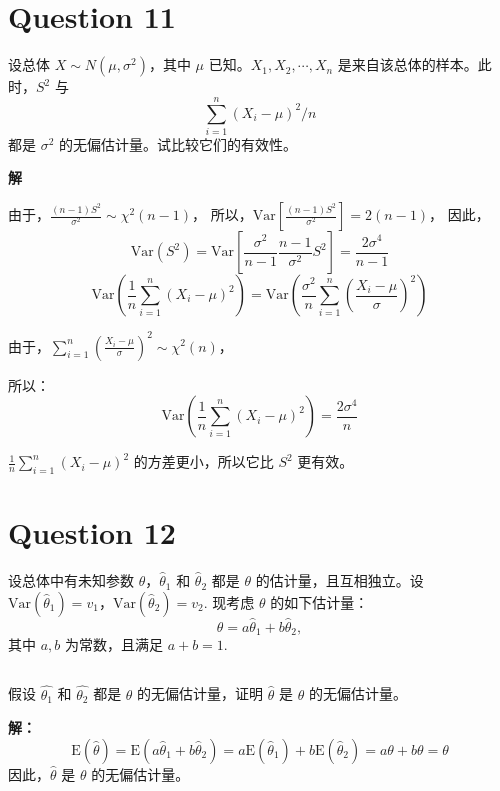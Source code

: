 \documentclass[12pt,a4paper]{article}
\begin{document}
\section{Question 11}

设总体 $X\sim N(\mu,\sigma^2)$，其中 $\mu$ 已知。$X_1,X_2,\cdots,X_n$ 是来自该总体的样本。此时，$S^2$ 与
\[
    \sum_{i=1}^{n}(X_i-\mu)^2/n
\]
都是 $\sigma^2$ 的无偏估计量。试比较它们的有效性。

\begin{answerbox}
\textbf{解}  

  由于，$\frac{(n-1)S^2}{\sigma^2} \sim \chi^2(n-1)$，
  所以，$\textrm{Var}\left[\frac{(n-1)S^2}{\sigma^2}\right] = 2(n-1)$，
  因此，
  $$
  \mathrm{Var}(S^2) = \mathrm{Var}\left[\frac{\sigma^2}{n-1} \frac{n-1}{\sigma^2} S^2\right] = \frac{2\sigma^4}{n-1}
  $$
  $$
  \mathrm{Var}\left(\frac{1}{n}\sum_{i=1}^n (X_i-\mu)^2\right) = \mathrm{Var}\left(\frac{\sigma^2}{n}\sum_{i=1}^n \left(\frac{X_i-\mu}{\sigma}\right)^2\right)
  $$
  
  由于，$\sum_{i=1}^n \left(\frac{X_i-\mu}{\sigma}\right)^2 \sim \chi^2(n)$，

  所以：
  $$
  \mathrm{Var}\left(\frac{1}{n}\sum_{i=1}^n (X_i-\mu)^2\right) = \frac{2\sigma^4}{n}
  $$

  $\frac{1}{n}\sum_{i=1}^n (X_i-\mu)^2$ 的方差更小，所以它比 $S^2$ 更有效。
\end{answerbox}

\section{Question 12}

设总体中有未知参数 $\theta$，$\hat{\theta}_1$ 和 $\hat{\theta}_2$ 都是 $\theta$ 的估计量，且互相独立。设 $\mathrm{Var}(\hat{\theta}_1)=v_1$，$\mathrm{Var}(\hat{\theta}_2)=v_2$. 现考虑 $\theta$ 的如下估计量：
\[
    \hat{\theta}=a\hat{\theta}_1+b\hat{\theta}_2,
\]
其中 $a,b$ 为常数，且满足 $a+b=1$.

\subsection{}

假设 $\hat{\theta_1}$ 和 $\hat{\theta_2}$ 都是 $\theta$ 的无偏估计量，证明 $\hat{\theta}$ 是 $\theta$ 的无偏估计量。

\begin{answerbox}
  \textbf{解：}
  $$
  \mathrm{E}(\hat{\theta}) = \mathrm{E}(a\hat{\theta}_1+b\hat{\theta}_2) = a\mathrm{E}(\hat{\theta}_1)+b\mathrm{E}(\hat{\theta}_2) = a\theta+b\theta = \theta
  $$
  因此，$\hat{\theta}$ 是 $\theta$ 的无偏估计量。
\end{answerbox}
\end{document}
